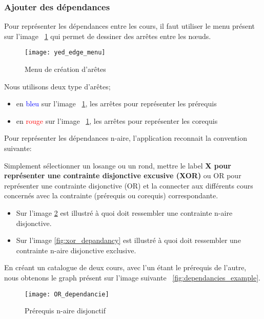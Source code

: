 \subsubsection{Ajouter des dépendances}

Pour représenter les dépendances entre les cours, il faut utiliser le menu présent sur l'image  ~\ref{fig:yed_edge_menu} qui permet de dessiner des arrêtes entre les nœuds.

\begin{figure}[htb]
\centering
\caption{Menu de création d’arêtes}
\label{fig:yed_edge_menu}
\texttt{[image: yed\_edge\_menu]}
\end{figure}

Nous utilisons deux type d’arêtes;

\begin{itemize}
\item en \textcolor{blue}{bleu} sur l'image ~\ref{fig:yed_edge_menu}, les arrêtes pour représenter les prérequis
\item en \textcolor{red}{rouge} sur l'image ~\ref{fig:yed_edge_menu}, les arrêtes pour représenter les corequis
\end{itemize}

Pour représenter les dépendances n-aire, l'application reconnait la convention suivante:

Simplement sélectionner un losange ou un rond, mettre le label \textbf{X pour représenter une contrainte disjonctive excusive (XOR)} ou {OR pour représenter une contrainte disjonctive (OR)} et la connecter aux différents cours concernés avec la contrainte (prérequis ou corequis) correspondante.

\begin{itemize}
\item Sur l'image \ref{fig:or_depandancy} est illustré à quoi doit ressembler une contrainte n-aire disjonctive.
\item Sur l'image \ref{fig:xor_depandancy} est illustré à quoi doit ressembler une contrainte n-aire disjonctive exclusive.
\end{itemize}

En créant un catalogue de deux cours, avec l'un étant le prérequis de l'autre, nous obtenons le graph présent sur l'image suivante ~\ref{fig:dependancies_example}.

\begin{figure}[htb]
\centering
\caption{Prérequis n-aire disjonctif}
\label{fig:or_depandancy}
\texttt{[image: OR\_dependancie]}
\end{figure}


